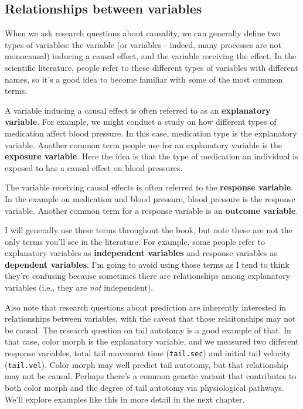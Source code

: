 \documentclass[
]{book}
\begin{document}
\subsection{Relationships between variables}\label{relationships-between-variables}

When we ask research questions about causality, we can generally define two types of variables: the variable (or variables - indeed, many processes are not monocausal) inducing a causal effect, and the variable receiving the effect. In the scientific literature, people refer to these different types of variables with different names, so it's a good idea to become familiar with some of the most common terms.

A variable inducing a causal effect is often referred to as an \textbf{explanatory variable}. For example, we might conduct a study on how different types of medication affect blood pressure. In this case, medication type is the explanatory variable. Another common term people use for an explanatory variable is the \textbf{exposure variable}. Here the idea is that the type of medication an individual is exposed to has a causal effect on blood pressures.

The variable receiving causal effects is often referred to the \textbf{response variable}. In the example on medication and blood pressure, blood pressure is the response variable. Another common term for a response variable is an \textbf{outcome variable}.

I will generally use these terms throughout the book, but note these are not the only terms you'll see in the literature. For example, some people refer to explanatory variables as \textbf{independent variables} and response variables as \textbf{dependent variables}. I'm going to avoid using those terms as I tend to think they're confusing because sometimes there are relationships among explanatory variables (i.e., they are \emph{not} independent).

Also note that research questions about prediction are inherently interested in relationships between variables, with the caveat that those relaitonships may not be causal. The research question on tail autotomy is a good example of that. In that case, color morph is the explanatory variable, and we measured two different response variables, total tail movement time (\texttt{tail.sec}) and initial tail velocity (\texttt{tail.vel}). Color morph may well predict tail autotomy, but that relationship may not be causal. Perhaps there's a common genetic variant that contributes to both color morph and the degree of tail autotomy via physiological pathways. We'll explore examples like this in more detail in the next chapter.
\end{document}
